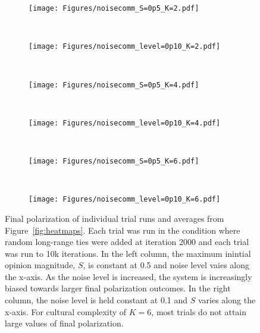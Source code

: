 \begin{figure}[t!]
  \centering
      \begin{subfigure}[t]{0.49\textwidth}
          \centering
          \texttt{[image: Figures/noisecomm\_S=0p5\_K=2.pdf]}
      \end{subfigure}
      ~
      \begin{subfigure}[t]{0.49\textwidth}
          \centering
          \texttt{[image: Figures/noisecomm\_level=0p10\_K=2.pdf]}
      \end{subfigure} \\
      \begin{subfigure}[t]{0.49\textwidth}
          \centering
          \texttt{[image: Figures/noisecomm\_S=0p5\_K=4.pdf]}
      \end{subfigure}
      ~
      \begin{subfigure}[t]{0.49\textwidth}
          \centering
          \texttt{[image: Figures/noisecomm\_level=0p10\_K=4.pdf]}
      \end{subfigure} \\
      \begin{subfigure}[t]{0.49\textwidth}
          \centering
          \texttt{[image: Figures/noisecomm\_S=0p5\_K=6.pdf]}
      \end{subfigure}
      ~
      \begin{subfigure}[t]{0.49\textwidth}
          \centering
          \texttt{[image: Figures/noisecomm\_level=0p10\_K=6.pdf]}
      \end{subfigure}
  \caption{Final polarization of individual trial runs and averages from
    Figure~\ref{fig:heatmaps}. Each trial was run in the condition where
    random long-range ties were added at iteration 2000 and each trial was
    run to 10k iterations. In the left column, the maximum inintial opinion
    magnitude, $S$, is constant at 0.5 and noise level vaies along the x-axis. 
    As the noise level is increased, the
    system is increasingly biased towards larger final polarization outcomes.
    In the right column, the noise level is held constant at 0.1 and $S$ 
    varies along the x-axis. For cultural complexity of $K=6$, most trials do
    not attain large values of final polarization.
  }
  \label{fig:single-runs-commnoise}
\end{figure}
